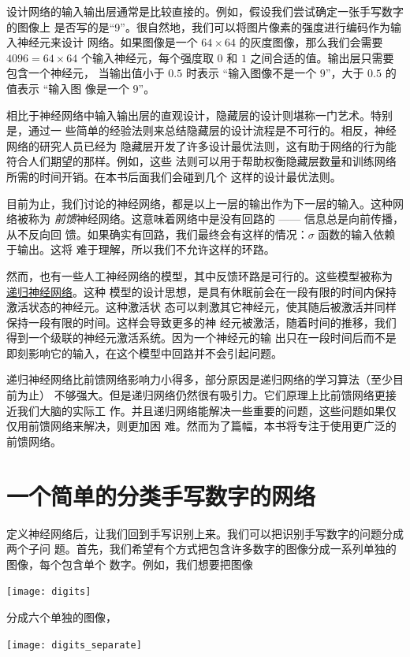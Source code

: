 设计网络的输入输出层通常是比较直接的。例如，假设我们尝试确定一张手写数字的图像上
是否写的是``9''。很自然地，我们可以将图片像素的强度进行编码作为输入神经元来设计
网络。如果图像是一个 $64 \times 64$ 的灰度图像，那么我们会需要 $4096 = 64 \times
64$ 个输入神经元，每个强度取 $0$ 和 $1$ 之间合适的值。输出层只需要包含一个神经元，
当输出值小于 $0.5$ 时表示 ``输入图像不是一个 $9$''，大于 $0.5$ 的值表示 ``输入图
像是一个 $9$''。

相比于神经网络中输入输出层的直观设计，隐藏层的设计则堪称一门艺术。特别是，通过一
些简单的经验法则来总结隐藏层的设计流程是不可行的。相反，神经网络的研究人员已经为
隐藏层开发了许多设计最优法则，这有助于网络的行为能符合人们期望的那样。例如，这些
法则可以用于帮助权衡隐藏层数量和训练网络所需的时间开销。在本书后面我们会碰到几个
这样的设计最优法则。

目前为止，我们讨论的神经网络，都是以上一层的输出作为下一层的输入。这种网络被称为
\emph{前馈}神经网络。这意味着网络中是没有回路的 —— 信息总是向前传播，从不反向回
馈。如果确实有回路，我们最终会有这样的情况：$\sigma$ 函数的输入依赖于输出。这将
难于理解，所以我们不允许这样的环路。

然而，也有一些人工神经网络的模型，其中反馈环路是可行的。这些模型被称为%
\href{http://en.wikipedia.org/wiki/Recurrent_neural_network}{递归神经网络}。这种
模型的设计思想，是具有休眠前会在一段有限的时间内保持激活状态的神经元。这种激活状
态可以刺激其它神经元，使其随后被激活并同样保持一段有限的时间。这样会导致更多的神
经元被激活，随着时间的推移，我们得到一个级联的神经元激活系统。因为一个神经元的输
出只在一段时间后而不是即刻影响它的输入，在这个模型中回路并不会引起问题。

递归神经网络比前馈网络影响力小得多，部分原因是递归网络的学习算法（至少目前为止）
不够强大。但是递归网络仍然很有吸引力。它们原理上比前馈网络更接近我们大脑的实际工
作。并且递归网络能解决一些重要的问题，这些问题如果仅仅用前馈网络来解决，则更加困
难。然而为了篇幅，本书将专注于使用更广泛的前馈网络。

\section{一个简单的分类手写数字的网络}

定义神经网络后，让我们回到手写识别上来。我们可以把识别手写数字的问题分成两个子问
题。首先，我们希望有个方式把包含许多数字的图像分成一系列单独的图像，每个包含单个
数字。例如，我们想要把图像
\begin{center}
  \texttt{[image: digits]}
\end{center}
分成六个单独的图像，
\begin{center}
  \texttt{[image: digits\_separate]}
\end{center}

